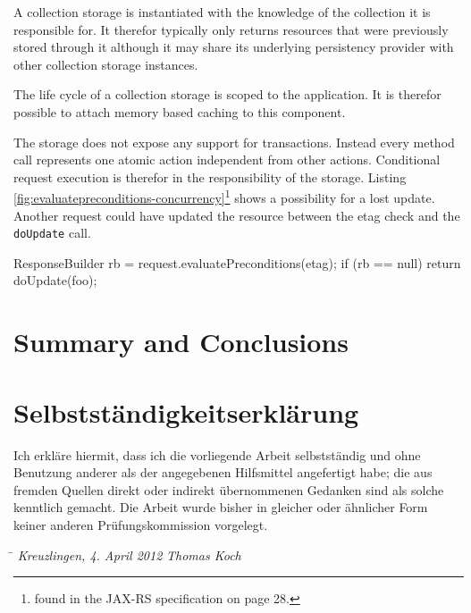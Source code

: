 \documentclass[12pt,a4paper,twoside]{scrartcl}		%
\begin{document}
A collection storage is instantiated with the knowledge of the collection it is
responsible for. It therefor typically only returns resources that were
previously stored through it although it may share its underlying persistency
provider with other collection storage instances.

The life cycle of a collection storage is scoped to the application. It is
therefor possible to attach memory based caching to this component.

The storage does not expose any support for transactions. Instead every method
call represents one atomic action independent from other actions. Conditional
request execution is therefor in the responsibility of the storage. Listing
\ref{fig:evaluatepreconditions-concurrency}\footnote{found in the JAX-RS
  specification on page 28.} shows a possibility for a lost update. Another
request could have updated the resource between the etag check and the
\lstinline:doUpdate: call.

\begin{javalisting}[label=fig:evaluatepreconditions-concurrency,
                   caption={Potential lost-update problem with JAX-RS}]
ResponseBuilder rb = request.evaluatePreconditions(etag);
if (rb == null)
  return doUpdate(foo);
\end{javalisting}



\section{Summary and Conclusions}

\newpage
{}


\section*{Selbstständigkeitserklärung}
\thispagestyle{empty}
Ich erkläre hiermit, dass ich die vorliegende Arbeit selbstständig und ohne
Benutzung anderer als der angegebenen Hilfsmittel angefertigt habe; die aus
fremden Quellen direkt oder indirekt übernommenen Gedanken sind als solche
kenntlich gemacht.  Die Arbeit wurde bisher in gleicher oder ähnlicher Form
keiner anderen Prüfungskommission vorgelegt.
\vspace{3cm}
\begin{tabbing}
\hspace{6cm}  \= \kill
\textit{Kreuzlingen, 4. April 2012} \> \textit{Thomas Koch}
\end{tabbing}
\end{document}
